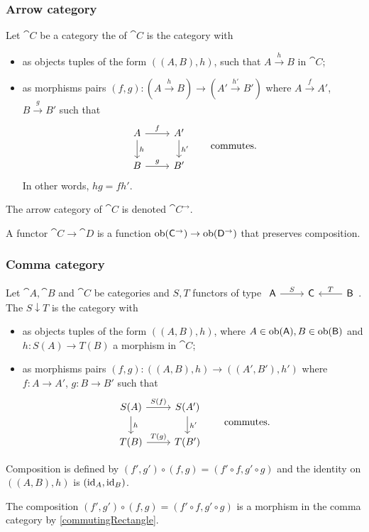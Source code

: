 \subsubsection{Arrow category}
\begin{definition}
Let $\cat{C}$ be a category the  of $\cat{C}$ is the category with 
\begin{itemize}
\item as objects tuples of the form $((A,B), h)$, such that $A \overset{h}{\longrightarrow} B$ in $\cat{C}$;
\item as morphisms pairs $(f,g): (A \overset{h}{\longrightarrow} B) \to (A' \overset{h'}{\longrightarrow} B')$ where $A \overset{f}{\longrightarrow} A'$, $B \overset{g}{\longrightarrow} B'$ such that
\[ \begin{tikzcd}
A \rar{f} \dar{h} & A' \dar{h'} \\
B \rar{g} & B'
\end{tikzcd} \qquad\text{commutes.} \]
In other words, $hg = fh'$.
\end{itemize}
The arrow category of $\cat{C}$ is denoted $\cat{C}^\to$.
\end{definition}

\begin{lemma}
A functor $\cat{C}\to\cat{D}$ is a function $\operatorname{ob}(\mathsf{C}^\to) \to \operatorname{ob}(\mathsf{D}^\to)$ that preserves composition.
\end{lemma}


\subsubsection{Comma category}
\begin{definition}
Let $\cat{A}, \cat{B}$ and $\cat{C}$ be categories and $S, T$ functors of type $\begin{tikzcd}
\cat{A} \ar[r, "S"] & \cat{C} & \lar[swap]{T} \cat{B}
\end{tikzcd}$. The  $S\downarrow T$ is the category with
\begin{itemize}
\item as objects tuples of the form $((A,B), h)$, where $A\in\operatorname{ob}(\mathsf{A}), B\in\operatorname{ob}(\mathsf{B})$ and $h: S(A) \to T(B)$ a morphism in $\cat{C}$;
\item as morphisms pairs $(f,g): ((A,B), h) \to ((A',B'), h')$ where $f:A\to A'$, $g: B\to B'$ such that
\[ \begin{tikzcd}
S(A) \rar{S(f)} \dar{h} & S(A') \dar{h'} \\
T(B) \rar{T(g)} & T(B')
\end{tikzcd} \qquad\text{commutes.} \]
\end{itemize}
Composition is defined by $(f',g') \circ (f,g) = (f'\circ f, g'\circ g)$ and the identity on $((A,B),h)$ is $(\operatorname{id}_A, \operatorname{id}_B)$.
\end{definition}
The composition $(f',g') \circ (f,g) = (f'\circ f, g'\circ g)$ is a morphism in the comma category by \ref{commutingRectangle}.

